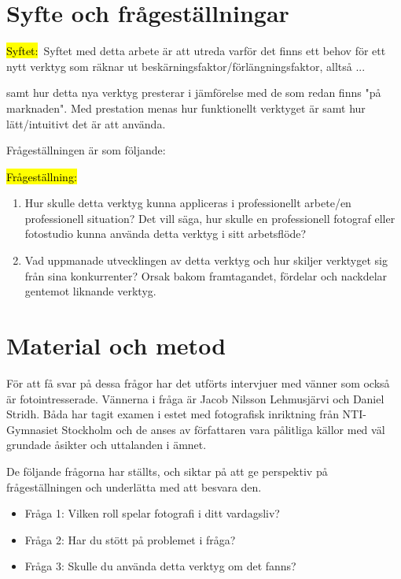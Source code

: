 \documentclass[11pt]{article}
\begin{document}
\section{Syfte och frågeställningar}
\hl{Syftet:}\ Syftet med detta arbete är att utreda varför det finns ett behov
för ett nytt verktyg som räknar ut beskärningsfaktor/förlängningsfaktor, alltså
...

samt hur detta nya verktyg presterar i jämförelse med de som redan finns
"på marknaden". Med prestation menas hur funktionellt verktyget är samt hur
lätt/intuitivt det är att använda.

Frågeställningen är som följande:\par

\hl{Frågeställning:} 
\begin{enumerate}
    \item Hur skulle detta verktyg kunna appliceras i professionellt arbete/en
        professionell situation? Det vill säga, hur skulle en professionell
        fotograf eller fotostudio kunna använda detta verktyg i sitt
        arbetsflöde?
    \item Vad uppmanade utvecklingen av detta verktyg och hur skiljer verktyget
        sig från sina konkurrenter? Orsak bakom framtagandet, fördelar och
        nackdelar gentemot liknande verktyg.
\end{enumerate}

\section{Material och metod}
\sloppy
För att få svar på dessa frågor har det utförts intervjuer med vänner som också
är fotointresserade. Vännerna i fråga är Jacob Nilsson Lehmusjärvi och Daniel
Stridh. Båda har tagit examen i estet med fotografisk inriktning från
NTI-Gymnasiet Stockholm och de anses av författaren vara pålitliga källor med
väl grundade åsikter och uttalanden i ämnet.\par

De följande frågorna har ställts, och siktar på att ge perspektiv på
frågeställningen och underlätta med att besvara den.
\fussy

\begin{itemize}
    \item Fråga 1: Vilken roll spelar fotografi i ditt vardagsliv?
    \item Fråga 2: Har du stött på problemet i fråga?
    \item Fråga 3: Skulle du använda detta verktyg om det fanns?
\end{itemize}
\end{document}
